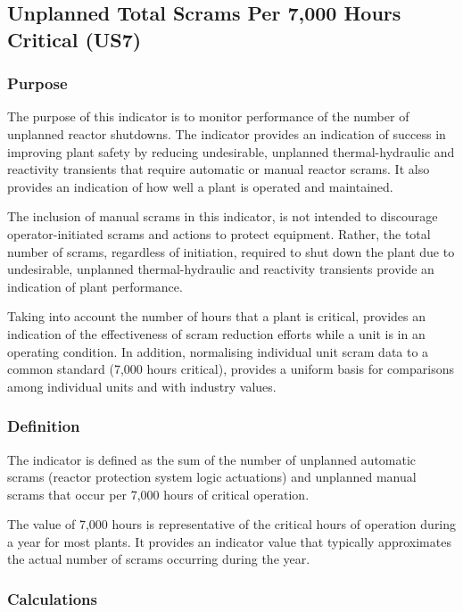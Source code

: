 \subsection{Unplanned Total Scrams Per 7,000 Hours Critical (US7)}

\subsubsection{Purpose}

The purpose of this indicator is to monitor performance of the number
of unplanned reactor shutdowns. The indicator provides an indication
of success in improving plant safety by reducing undesirable,
unplanned thermal-hydraulic and reactivity transients that require
automatic or manual reactor scrams. It also provides an indication of
how well a plant is operated and maintained. 

The inclusion of manual scrams in this indicator, is not intended to
discourage operator-initiated scrams and actions to protect
equipment. Rather, the total number of scrams, regardless of
initiation, required to shut down the plant due to undesirable,
unplanned thermal-hydraulic and reactivity transients provide an
indication of plant performance.

Taking into account the number of hours that a plant is critical,
provides an indication of the effectiveness of scram reduction efforts
while a unit is in an operating condition. In addition, normalising
individual unit scram data to a common standard (7,000 hours
critical), provides a uniform basis for comparisons among individual
units and with industry values.

\subsubsection{Definition}

The indicator is defined as the sum of the number of unplanned
automatic scrams (reactor protection system logic actuations) and
unplanned manual scrams that occur per 7,000 hours of critical
operation.
 
The value of 7,000 hours is representative of the critical hours of
operation during a year for most plants. It provides an indicator
value that typically approximates the actual number of scrams
occurring during the year.
 
\subsubsection{Calculations}

